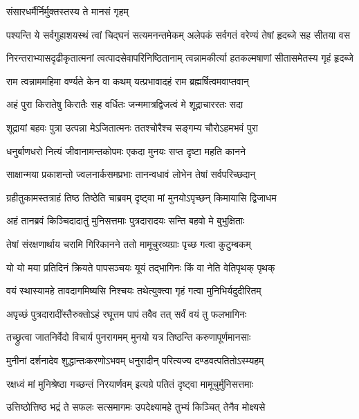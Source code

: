 \onelineshloka
{संसारधर्मैर्निर्मुक्तस्तस्य ते मानसं गृहम्} %

\fourlineindentedshloka
{पश्यन्ति ये सर्वगुहाशयस्थं}
{त्वां चिद्घनं सत्यमनन्तमेकम्}
{अलेपकं सर्वगतं वरेण्यं}
{तेषां हृदब्जे सह सीतया वस} %

\fourlineindentedshloka
{निरन्तराभ्यासदृढीकृतात्मनां}
{त्वत्पादसेवापरिनिष्ठितानाम्}
{त्वन्नामकीर्त्या हतकल्मषाणां}
{सीतासमेतस्य गृहं हृदब्जे} %

\twolineshloka
{राम त्वन्नाममहिमा वर्ण्यते केन वा कथम्}
{यत्प्रभावादहं राम ब्रह्मर्षित्वमवाप्तवान्} %

\twolineshloka
{अहं पुरा किरातेषु किरातैः सह वर्धितः}
{जन्ममात्रद्विजत्वं मे शूद्राचाररतः सदा} %

\twolineshloka
{शूद्रायां बहवः पुत्रा उत्पन्ना मेऽजितात्मनः}
{ततश्चोरैश्च सङ्गम्य चौरोऽहमभवं पुरा} %

\twolineshloka
{धनुर्बाणधरो नित्यं जीवानामन्तकोपमः}
{एकदा मुनयः सप्त दृष्टा महति कानने} %

\twolineshloka
{साक्षान्मया प्रकाशन्तो ज्वलनार्कसमप्रभाः}
{तानन्वधावं लोभेन तेषां सर्वपरिच्छदान्} %

\twolineshloka
{ग्रहीतुकामस्तत्राहं तिष्ठ तिष्ठेति चाब्रवम्}
{दृष्ट्वा मां मुनयोऽपृच्छन् किमायासि द्विजाधम} %

\twolineshloka
{अहं तानब्रवं किञ्चिदादातुं मुनिसत्तमाः}
{पुत्रदारादयः सन्ति बहवो मे बुभुक्षिताः} %

\twolineshloka
{तेषां संरक्षणार्थाय चरामि गिरिकानने}
{ततो मामूचुरव्यग्राः पृच्छ गत्वा कुटुम्बकम्} %

\twolineshloka
{यो यो मया प्रतिदिनं क्रियते पापसञ्चयः}
{यूयं तद्भागिनः किं वा नेति वेतिपृथक् पृथक्} %

\twolineshloka
{वयं स्थास्यामहे तावदागमिष्यसि निश्चयः}
{तथेत्युक्त्वा गृहं गत्वा मुनिभिर्यदुदीरितम्} %

\twolineshloka
{अपृच्छं पुत्रदारादींस्तैरुक्तोऽहं रघूत्तम}
{पापं तवैव तत् सर्वं वयं तु फलभागिनः} %

\twolineshloka
{तच्छ्रुत्वा जातनिर्वेदो विचार्य पुनरागमम्}
{मुनयो यत्र तिष्ठन्ति करुणापूर्णमानसाः} %

\twolineshloka
{मुनीनां दर्शनादेव शुद्धान्तःकरणोऽभवम्}
{धनुरादीन् परित्यज्य दण्डवत्पतितोऽस्म्यहम्} %

\twolineshloka
{रक्षध्वं मां मुनिश्रेष्ठा गच्छन्तं निरयार्णवम्}
{इत्यग्रे पतितं दृष्ट्वा मामूचुर्मुनिसत्तमाः} %

\twolineshloka
{उत्तिष्ठोत्तिष्ठ भद्रं ते सफलः सत्समागमः}
{उपदेक्ष्यामहे तुभ्यं किञ्चित् तेनैव मोक्ष्यसे} %

